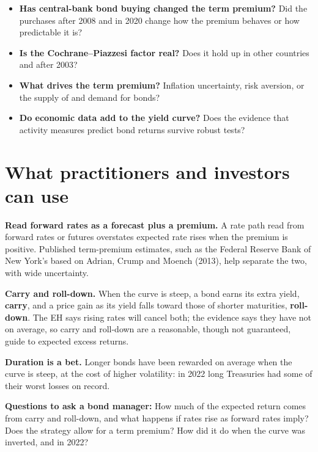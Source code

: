 \begin{itemize}
  \item \textbf{Has central-bank bond buying changed the term premium?} Did the purchases after 2008 and in 2020 change how the premium behaves or how predictable it is?
  \item \textbf{Is the Cochrane--Piazzesi factor real?} Does it hold up in other countries and after 2003?
  \item \textbf{What drives the term premium?} Inflation uncertainty, risk aversion, or the supply of and demand for bonds?
  \item \textbf{Do economic data add to the yield curve?} Does the evidence that activity measures predict bond returns survive robust tests?
\end{itemize}

\section{What practitioners and investors can use}
\label{sec:07-investors}

\textbf{Read forward rates as a forecast plus a premium.} A rate path read from forward rates or futures overstates expected rate rises when the premium is positive. Published term-premium estimates, such as the Federal Reserve Bank of New York's based on Adrian, Crump and Moench (2013), help separate the two, with wide uncertainty.

\textbf{Carry and roll-down.} When the curve is steep, a bond earns its extra yield, \textbf{carry}, and a price gain as its yield falls toward those of shorter maturities, \textbf{roll-down}. The EH says rising rates will cancel both; the evidence says they have not on average, so carry and roll-down are a reasonable, though not guaranteed, guide to expected excess returns.

\textbf{Duration is a bet.} Longer bonds have been rewarded on average when the curve is steep, at the cost of higher volatility: in 2022 long Treasuries had some of their worst losses on record.

\textbf{Questions to ask a bond manager:} How much of the expected return comes from carry and roll-down, and what happens if rates rise as forward rates imply? Does the strategy allow for a term premium? How did it do when the curve was inverted, and in 2022?

